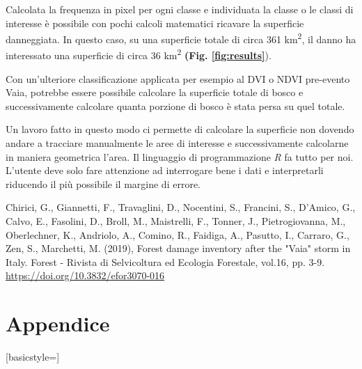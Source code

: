 \documentclass[a4paper,12pt]{article}
\begin{document}
Calcolata la frequenza in pixel per ogni classe e individuata la classe o le classi di interesse è possibile con pochi calcoli matematici ricavare la superficie danneggiata. In questo caso, su una superficie totale di circa 361 km\textsuperscript{2}, il danno ha interessato una superficie di circa 36 km\textsuperscript{2} \textbf{(Fig. \ref{fig:results}}). 

Con un'ulteriore classificazione applicata per esempio al DVI o NDVI pre-evento Vaia, potrebbe essere possibile calcolare la superficie totale di bosco e successivamente calcolare quanta porzione di bosco è stata persa su quel totale.

Un lavoro fatto in questo modo ci permette di calcolare la superficie non dovendo andare a tracciare manualmente le aree di interesse e successivamente calcolarne in maniera geometrica l'area. Il linguaggio di programmazione \textit{R} fa tutto per noi. L'utente deve solo fare attenzione ad interrogare bene i dati e interpretarli riducendo il più possibile il margine di errore.


\begin{thebibliography}{999}

Chirici, G., Giannetti, F., Travaglini, D., Nocentini, S., Francini, S., D'Amico, G., Calvo, E., Fasolini, D., Broll, M., Maistrelli, F., Tonner, J., Pietrogiovanna, M., Oberlechner, K., Andriolo, A., Comino, R., Faidiga, A., Pasutto, I., Carraro, G., Zen, S., Marchetti, M. (2019), Forest damage inventory after the "Vaia" storm in Italy. Forest - Rivista di Selvicoltura ed Ecologia Forestale, vol.16, pp. 3-9. \url{https://doi.org/10.3832/efor3070-016}

\end{thebibliography}






\newpage

\section{Appendice}\label{sec:appendice}
[basicstyle=\tiny]


\end{document}
